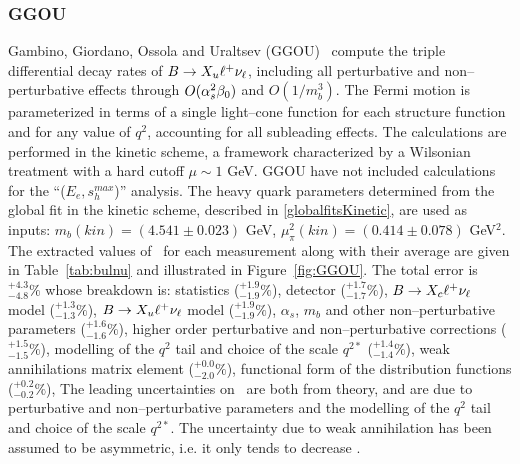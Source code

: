 \subsubsection{GGOU}
Gambino, Giordano, Ossola and Uraltsev (GGOU)~\cite{Gambino:2007rp} 
compute the triple differential decay rates of $B \to X_u \ell^+ \nu_\ell$, 
including all perturbative and non--perturbative effects through $O(\alpha_s^2 \beta_0)$ 
and $O(1/m_b^3)$. 
The Fermi motion is parameterized in terms of a single light--cone function 
for each structure function and for any value of $q^2$, accounting for all subleading effects. 
The calculations are performed in the kinetic scheme, a framework characterized by a Wilsonian 
treatment with a hard cutoff $\mu \sim 1 $ GeV.
GGOU have not included calculations for the ``($E_e,s^{max}_h$)'' analysis. 
The heavy quark parameters determined  
from the global fit in the kinetic scheme, described in \ref{globalfitsKinetic}, are used as inputs: 
$m_b(kin)=(4.541 \pm 0.023)$ GeV, 
$\mu_\pi^2(kin)=(0.414 \pm 0.078)$ GeV$^2$. 
The extracted values
of \vub\, for each measurement along with their average are given in
Table~\ref{tab:bulnu} and illustrated in Figure~\ref{fig:GGOU}.
The total error is $^{+4.3}_{-4.8}\%$ whose breakdown is:
statistics ($^{+1.9}_{-1.9}\%$),
detector ($^{+1.7}_{-1.7}\%$),
$B\to X_c \ell^+ \nu_\ell$ model ($^{+1.3}_{-1.3}\%$),
$B\to X_u \ell^+ \nu_\ell$ model ($^{+1.9}_{-1.9}\%$),
$\alpha_s$, $m_b$ and other non--perturbative parameters ($^{+1.6}_{-1.6}\%$), 
higher order perturbative and non--perturbative corrections ($^{+1.5}_{-1.5}\%$), 
modelling of the $q^2$ tail and choice of the scale $q^{2*}$ ($^{+1.4}_{-1.4}\%$), 
weak annihilations matrix element ($^{+0.0}_{-2.0}\%$), 
functional form of the distribution functions ($^{+0.2}_{-0.2}\%$), 
The leading uncertainties
on  \vub\ are both from theory, and are due to perturbative and non--perturbative
parameters and the modelling of the $q^2$ tail and choice of the scale $q^{2*}$. 
The uncertainty due to 
weak annihilation has been assumed to be asymmetric, i.e. it only tends to decrease \vub.

